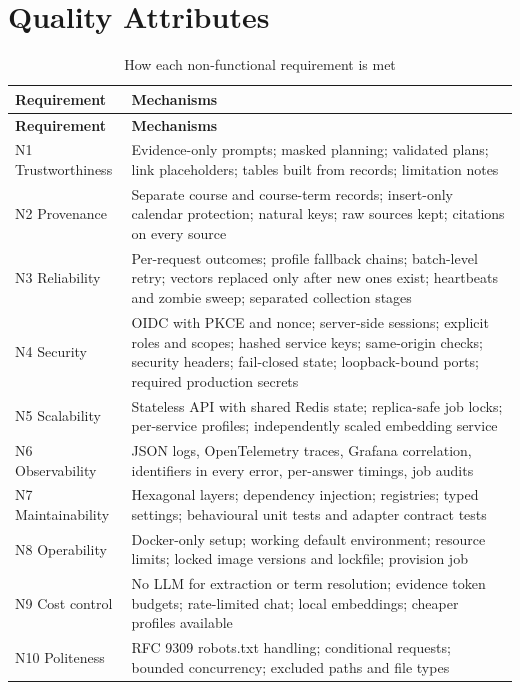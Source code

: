 \documentclass[11pt,letterpaper]{report}
\begin{document}
\chapter{Quality Attributes}\label{ch:quality}
\begin{longtable}{@{}P{3.2cm}P{12.2cm}@{}}
\caption{How each non-functional requirement is met}\label{tab:quality}\\
\toprule
\textbf{Requirement} & \textbf{Mechanisms} \\
\midrule
\endfirsthead
\toprule
\textbf{Requirement} & \textbf{Mechanisms} \\
\midrule
\endhead
N1 Trustworthiness & Evidence-only prompts; masked planning; validated plans; link placeholders; tables built from records; limitation notes \\
N2 Provenance & Separate course and course-term records; insert-only calendar protection; natural keys; raw sources kept; citations on every source \\
N3 Reliability & Per-request outcomes; profile fallback chains; batch-level retry; vectors replaced only after new ones exist; heartbeats and zombie sweep; separated collection stages \\
N4 Security & OIDC with PKCE and nonce; server-side sessions; explicit roles and scopes; hashed service keys; same-origin checks; security headers; fail-closed state; loopback-bound ports; required production secrets \\
N5 Scalability & Stateless API with shared Redis state; replica-safe job locks; per-service profiles; independently scaled embedding service \\
N6 Observability & JSON logs, OpenTelemetry traces, Grafana correlation, identifiers in every error, per-answer timings, job audits \\
N7 Maintainability & Hexagonal layers; dependency injection; registries; typed settings; behavioural unit tests and adapter contract tests \\
N8 Operability & Docker-only setup; working default environment; resource limits; locked image versions and lockfile; provision job \\
N9 Cost control & No LLM for extraction or term resolution; evidence token budgets; rate-limited chat; local embeddings; cheaper profiles available \\
N10 Politeness & RFC 9309 robots.txt handling; conditional requests; bounded concurrency; excluded paths and file types \\
\bottomrule
\end{longtable}
\end{document}

